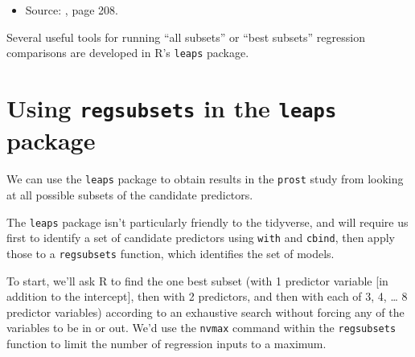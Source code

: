 \documentclass[]{book}
\newenvironment{Shaded}{\begin{snugshade}}{\end{snugshade}}
\newcommand{\KeywordTok}[1]{\textcolor[rgb]{0.13,0.29,0.53}{\textbf{#1}}}
\newcommand{\DataTypeTok}[1]{\textcolor[rgb]{0.13,0.29,0.53}{#1}}
\newcommand{\StringTok}[1]{\textcolor[rgb]{0.31,0.60,0.02}{#1}}
\newcommand{\OperatorTok}[1]{\textcolor[rgb]{0.81,0.36,0.00}{\textbf{#1}}}
\newcommand{\NormalTok}[1]{#1}
\providecommand{\tightlist}{%
  \setlength{\itemsep}{0pt}\setlength{\parskip}{0pt}}
\theoremstyle{definition}
\theoremstyle{definition}
\theoremstyle{definition}
\theoremstyle{remark}
\begin{document}
\begin{itemize}
\tightlist
\item
  Source: \citet{Hastie2001}, page 208.
\end{itemize}

Several useful tools for running ``all subsets'' or ``best subsets''
regression comparisons are developed in R's \texttt{leaps} package.

\section{\texorpdfstring{Using \texttt{regsubsets} in the \texttt{leaps}
package}{Using regsubsets in the leaps package}}\label{using-regsubsets-in-the-leaps-package}

We can use the \texttt{leaps} package to obtain results in the
\texttt{prost} study from looking at all possible subsets of the
candidate predictors.

The \texttt{leaps} package isn't particularly friendly to the tidyverse,
and will require us first to identify a set of candidate predictors
using \texttt{with} and \texttt{cbind}, then apply those to a
\texttt{regsubsets} function, which identifies the set of models.

To start, we'll ask R to find the one best subset (with 1 predictor
variable {[}in addition to the intercept{]}, then with 2 predictors, and
then with each of 3, 4, \ldots{} 8 predictor variables) according to an
exhaustive search without forcing any of the variables to be in or out.
We'd use the \texttt{nvmax} command within the \texttt{regsubsets}
function to limit the number of regression inputs to a maximum.

\begin{Shaded}
\end{Shaded}
\end{document}

